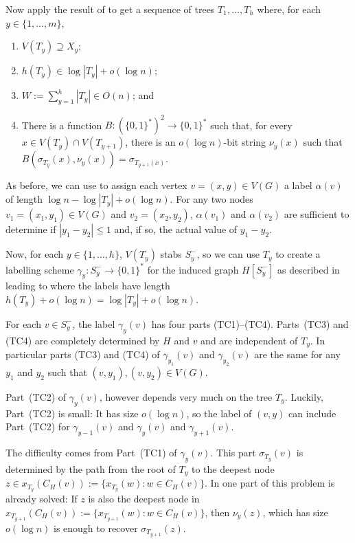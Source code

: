 \documentclass[kpfonts]{patmorin}
\begin{document}
Now apply the result of  to get a sequence of trees $T_1,\ldots,T_h$ where, for each $y\in\{1,\ldots,m\}$, 
\begin{enumerate}[(PRX1)]
  \item $V(T_y)\supseteq X_y$;
  \item $h(T_y)\in \log |T_y| + o(\log n)$;
  \item $W:=\sum_{y=1}^h |T_y|\in O(n)$; and
  \item There is a function $B:(\{0,1\}^*)^2\to\{0,1\}^*$ such that, for every $x\in V(T_y)\cap V(T_{y+1})$, there is an $o(\log n)$-bit string $\nu_y(x)$ such that $B(\sigma_{T_y}(x),\nu_y(x))=\sigma_{T_{y+1}(x)}$.
\end{enumerate}

As before, we can use  to assign each vertex $v=(x,y)\in V(G)$ a label $\alpha(v)$ of length $\log n - \log|T_y| + o(\log n)$. For any two nodes $v_1=(x_1,y_1)\in V(G)$ and $v_2=(x_2,y_2)$, $\alpha(v_1)$ and $\alpha(v_2)$ are sufficient to determine if $|y_1-y_2|\le 1$ and, if so, the actual value of $y_1-y_2$.

Now, for each $y\in\{1,\ldots,h\}$, $V(T_y)$ stabs $S^-_y$, so we can use $T_y$ to create a labelling scheme $\gamma_y:S^-_y\to\{0,1\}^*$ for the induced graph $H[S^-_y]$ as described in  leading to  where the labels have length $h(T_y) + o(\log n)=\log|T_y|+o(\log n)$.  

For each $v\in S^-_y$, the label $\gamma_y(v)$ has four parts (TC1)--(TC4).  Parts~(TC3) and (TC4) are completely determined by $H$ and $v$ and are independent of $T_y$.  In particular parts (TC3) and (TC4) of $\gamma_{y_1}(v)$ and $\gamma_{y_2}(v)$ are the same for any $y_1$ and $y_2$ such that $(v,y_1),(v,y_2)\in V(G)$.  

Part~(TC2) of $\gamma_y(v)$, however depends very much on the tree $T_y$.  Luckily, Part~(TC2) is small: It has size $o(\log n)$, so the label of $(v,y)$ can include Part~(TC2) for $\gamma_{y-1}(v)$ and $\gamma_{y}(v)$ and $\gamma_{y+1}(v)$.

The difficulty comes from Part~(TC1) of $\gamma_y(v)$.  This part $\sigma_{T_y}(v)$ is determined by the path from the root of $T_y$ to the deepest node $z\in x_{T_y}(C_H(v)):=\{x_{T_y}(w): w\in C_H(v)\}$.  In  one part of this problem is already solved: If $z$ is also the deepest node in $x_{T_{y+1}}(C_H(v)):=\{x_{T_{y+1}}(w): w\in C_H(v)\}$, then $\nu_y(z)$, which has size $o(\log n)$ is enough to recover $\sigma_{T_{y+1}}(z)$.
\end{document}
